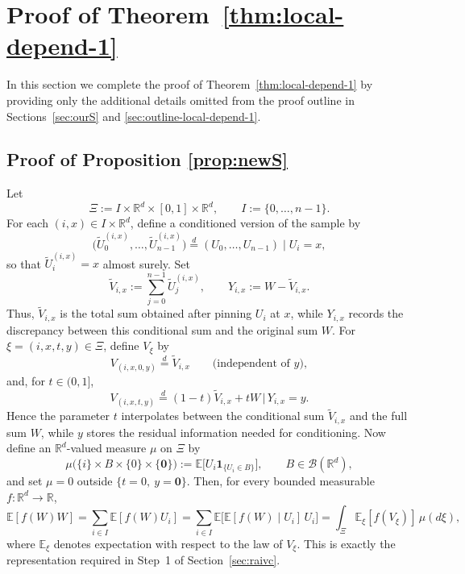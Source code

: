 \documentclass[mnsc,nonblindrev]{informs3}
\begin{document}


%

\ECSwitch
{}

\section{Proof of Theorem~\ref{thm:local-depend-1}}\label{sec:local-depend-1}
In this section we complete the proof of Theorem~\ref{thm:local-depend-1} by providing only the additional details
omitted from the proof outline in Sections~\ref{sec:ourS} and \ref{sec:outline-local-depend-1}.
\subsection{Proof of Proposition \ref{prop:newS}}\label{sec:proof-newS}
Let \[ \Xi := I\times\mathbb{R}^d\times[0,1]\times\mathbb{R}^d, \qquad I:=\{0,\dots,n-1\}. \] For each \((i,x)\in I\times\mathbb{R}^d\), define a conditioned version of the sample by \[ \bigl(\widetilde U^{(i,x)}_0,\dots,\widetilde U^{(i,x)}_{n-1}\bigr) \stackrel{d}{=} (U_0,\dots,U_{n-1}) \mid U_i=x, \] so that \(\widetilde U^{(i,x)}_i=x\) almost surely. Set \[ \widetilde V_{i,x}:=\sum_{j=0}^{n-1}\widetilde U^{(i,x)}_j, \qquad Y_{i,x}:=W-\widetilde V_{i,x}. \] Thus, \(\widetilde V_{i,x}\) is the total sum obtained after pinning \(U_i\) at \(x\), while \(Y_{i,x}\) records the discrepancy between this conditional sum and the original sum \(W\). For \(\xi=(i,x,t,y)\in\Xi\), define \(V_\xi\) by \[ V_{(i,x,0,y)}\stackrel{d}{=}\widetilde V_{i,x} \qquad\text{(independent of \(y\))}, \] and, for \(t\in(0,1]\), \[ V_{(i,x,t,y)}\stackrel{d}{=}(1-t)\widetilde V_{i,x}+tW \,\big|\, Y_{i,x}=y. \] Hence the parameter \(t\) interpolates between the conditional sum \(\widetilde V_{i,x}\) and the full sum \(W\), while \(y\) stores the residual information needed for conditioning. Now define an \(\mathbb{R}^d\)-valued measure \(\mu\) on \(\Xi\) by \[ \mu\bigl(\{i\}\times B\times\{0\}\times\{\mathbf{0}\}\bigr) := \mathbb{E}\bigl[U_i\mathbf{1}_{\{U_i\in B\}}\bigr], \qquad B\in\mathcal{B}(\mathbb{R}^d), \] and set \(\mu=0\) outside \(\{t=0,\ y=\mathbf{0}\}\). Then, for every bounded measurable \(f:\mathbb{R}^d\to\mathbb{R}\), \[ \mathbb{E}[f(W)W] = \sum_{i\in I}\mathbb{E}[f(W)U_i] = \sum_{i\in I}\mathbb{E}\bigl[\mathbb{E}[f(W)\mid U_i]\,U_i\bigr] = \int_{\Xi}\mathbb{E}_{\xi}[f(V_\xi)]\,\mu(d\xi), \] where \(\mathbb{E}_{\xi}\) denotes expectation with respect to the law of \(V_\xi\). This is exactly the representation required in Step~1 of Section~\ref{sec:raivc}. 
\end{document}
